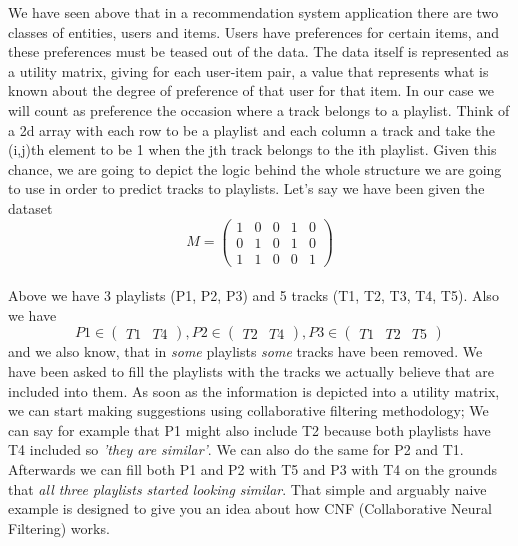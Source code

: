 \documentclass[]{article}
\begin{document}
\begin{center}
	We have seen above that in a recommendation system application there are two classes of entities, users and items. Users have preferences for certain items, and these preferences must be teased out of the data. The data itself is represented as a utility matrix, giving for each user-item pair, a value that represents what is known about the degree of preference of that user for that item. In our case we will count as preference the occasion where a track belongs to a playlist. Think of a 2d array with each row to be a playlist and each column a track
	and take the (i,j)th element to be 1 when the jth track belongs to the ith playlist. Given this chance, we are going to depict the logic behind the whole structure we are going to use in order to predict tracks to playlists.
	Let's say we have been given the dataset
	\\
	\begin{equation}
		M = 
		\left(\begin{array}{ccccc} 1 & 0 & 0 & 1 & 0\\ 0 & 1 & 0 & 1 & 0 \\ 1 & 1 & 0 & 0 & 1 \end{array}\right)
	\end{equation}
	\\
	Above we have 3 playlists (P1, P2, P3) and 5 tracks (T1, T2, T3, T4, T5). Also we have
	\begin{equation}
		P1 \in (\begin{array}{cc}T1 & T4 \end{array}), 
		P2 \in (\begin{array}{cc}T2 & T4 \end{array}), 
		P3 \in (\begin{array}{ccc}T1 & T2 & T5 \end{array})
	\end{equation}
	and we also know, that in \textit{some} playlists \textit{some} tracks have been removed. We have been asked to fill the playlists with the tracks we actually believe that are included into them.
	As soon as the information is depicted into a utility matrix, we can start making suggestions using collaborative filtering methodology; We can say for example that P1 might also include T2 because both playlists have T4 included so \textit{'they are similar'}. We can also do the same for P2 and T1. Afterwards we can fill both P1 and P2 with T5 and P3 with T4 on the grounds that \textit{all three playlists started looking similar}.
	That simple and arguably naive example is designed to give you an idea about how CNF (Collaborative Neural Filtering) works.
	

\end{center}
\end{document}
